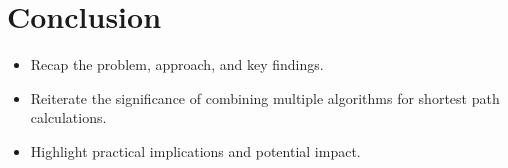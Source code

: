 \chapter{Conclusion}

\begin{itemize}
	\item Recap the problem, approach, and key findings.
	\item Reiterate the significance of combining multiple algorithms for shortest path calculations.
	\item Highlight practical implications and potential impact.
\end{itemize}
